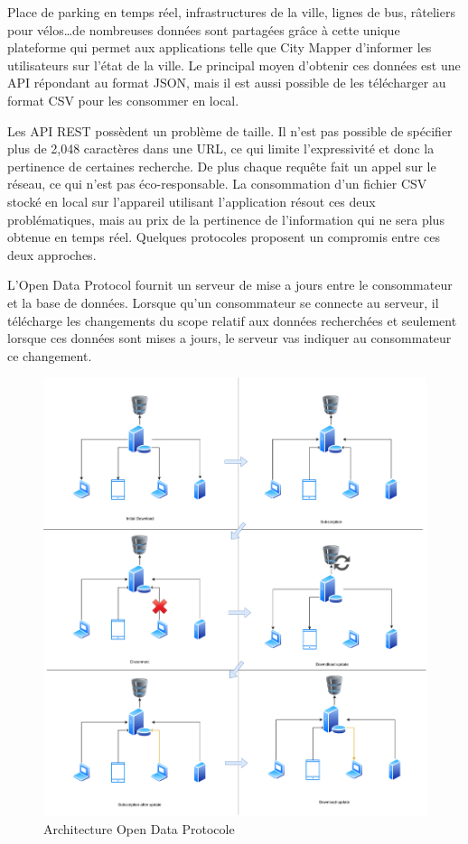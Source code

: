 Place de parking en temps réel, infrastructures de la ville, lignes de bus, râteliers pour vélos\dots de nombreuses
données sont partagées grâce à cette unique plateforme qui permet aux applications telle que City Mapper
d'informer les utilisateurs sur l'état de la ville.
Le principal moyen d'obtenir ces données est une API répondant au format JSON, mais il est aussi possible de les
télécharger au format CSV pour les consommer en local.

Les API REST possèdent un problème de taille. Il n'est pas possible de spécifier plus de
2,048 caractères dans une URL, ce qui limite l'expressivité et donc la pertinence de certaines recherche.
De plus chaque requête fait un appel sur le réseau, ce qui n'est pas éco-responsable.
La consommation d'un fichier CSV stocké en local sur l'appareil utilisant l'application résout ces deux problématiques,
mais au prix de la pertinence de l'information qui ne sera plus obtenue en temps réel.
Quelques protocoles proposent un compromis entre ces deux approches.

L'Open Data Protocol fournit un serveur de mise a jours entre le consommateur et la base de données.
Lorsque qu'un consommateur se connecte au serveur, il télécharge les changements du scope relatif aux données
recherchées et seulement lorsque ces données sont mises a jours, le serveur vas indiquer au consommateur
ce changement.

\begin{figure}[h!]
  \centering
  \includegraphics[scale=0.19]{media/open_data_protocol.png}
  \caption{Architecture Open Data Protocole}
\end{figure}



